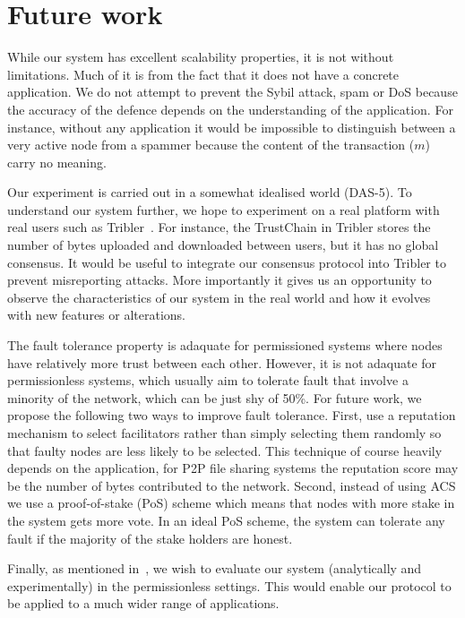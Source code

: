 \section{Future work}
While our system has excellent scalability properties, it is not without limitations.
Much of it is from the fact that it does not have a concrete application.
We do not attempt to prevent the Sybil attack, spam or DoS because the accuracy of the defence depends on the understanding of the application.
For instance, without any application it would be impossible to distinguish between a very active node from a spammer because the content of the transaction ($m$) carry no meaning.

Our experiment is carried out in a somewhat idealised world (DAS-5).
To understand our system further, we hope to experiment on a real platform with real users such as Tribler~\cite{pouwelse2008tribler}.
For instance, the TrustChain in Tribler stores the number of bytes uploaded and downloaded between users, but it has no global consensus.
It would be useful to integrate our consensus protocol into Tribler to prevent misreporting attacks.
More importantly it gives us an opportunity to observe the characteristics of our system in the real world and how it evolves with new features or alterations.

The fault tolerance property is adaquate for permissioned systems where nodes have relatively more trust between each other.
However, it is not adaquate for permissionless systems,
which usually aim to tolerate fault that involve a minority of the network,
which can be just shy of 50\%.
For future work, we propose the following two ways to improve fault tolerance.
First, use a reputation mechanism to select facilitators rather than simply selecting them randomly so that faulty nodes are less likely to be selected.
This technique of course heavily depends on the application,
for P2P file sharing systems the reputation score may be the number of bytes contributed to the network.
Second, instead of using ACS we use a proof-of-stake (PoS) scheme which means that nodes with more stake in the system gets more vote.
In an ideal PoS scheme, the system can tolerate any fault if the majority of the stake holders are honest.

Finally, as mentioned in~, we wish to evaluate our system (analytically and experimentally) in the permissionless settings.
This would enable our protocol to be applied to a much wider range of applications.
